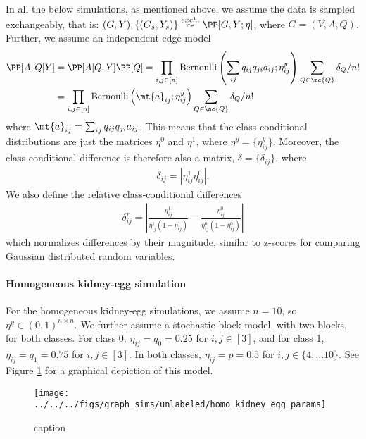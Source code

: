 In all the below simulations, as mentioned above, we assume the data is sampled exchangeably, that is: $(G,Y), \{(G_s,Y_s)\} \overset{exch.}{\sim} \PP[G,Y; \eta]$, where $G=(V,A,Q)$.  Further, we assume an independent edge model
\begin{align}
\PP[A,Q | Y] &= \PP[A|Q,Y] \PP[Q] = \prod_{i,j \in [n]} \text{Bernoulli}\left(\sum_{ij} q_{ij} q_{ji} a_{ij}; \eta_{ij}^y\right) \sum_{Q\in \mc{Q}} \delta_Q/n! \\
&=  \prod_{i,j \in [n]} \text{Bernoulli}\left(\mt{a}_{ij}; \eta_{ij}^y\right) \sum_{Q\in \mc{Q}} \delta_Q/n!
\end{align}
where $\mt{a}_{ij} = \sum_{ij} q_{ij} q_{ji} a_{ij}$.  This means that the class conditional distributions are just the matrices $\eta^0$ and $\eta^1$, where $\eta^y=\{\eta_{ij}^y\}$. Moreover, the class conditional difference is therefore also a matrix, $\delta=\{\delta_{ij}\}$, where
\begin{align}
	\delta_{ij} = | \eta_{ij}^1\eta_{ij}^0|.
\end{align}
We also define the relative class-conditional differences
\begin{align}
	\delta_{ij}^r = \left| \frac{\eta_{ij}^1}{\eta_{ij}^1 (1-\eta_{ij}^1)} - \frac{\eta_{ij}^0}{\eta_{ij}^0 (1-\eta_{ij}^0)} \right|
\end{align}
which normalizes differences by their magnitude, similar to z-scores for comparing Gaussian distributed random variables.

\paragraph{Homogeneous kidney-egg simulation} %
\label{par:homogeneous_kidney_egg_simulation}

For the homogeneous kidney-egg simulations, we assume $n=10$, so $\eta^y \in (0,1)^{n\times n}$.  We further assume a stochastic block model, with two blocks, for both classes.  For class 0, $\eta_{ij}=q_0=0.25$ for $i,j \in [3]$, and for class 1, $\eta_{ij}=q_1=0.75$ for $i,j \in [3]$.  In both classes, $\eta_{ij}=p=0.5$ for $i,j \in \{4,\ldots 10\}$.  See Figure \ref{fig:homo} for a graphical depiction of this model.  

\begin{figure}[htbp]
	\centering
		\texttt{[image: ../../../figs/graph\_sims/unlabeled/homo\_kidney\_egg\_params]}
	\caption{caption}
	\label{fig:homo}
\end{figure}


